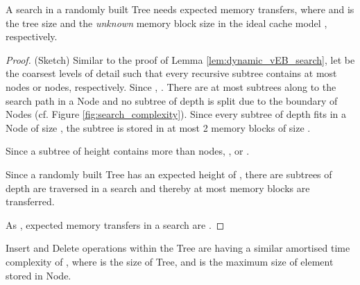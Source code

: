 \begin{lemma}
A search in a randomly built Tree needs  expected memory
transfers, where  and  is the tree size and the {\em unknown} memory
block size in the ideal cache model \cite{Frigo:1999:CA:795665.796479}, 
respectively. 
\label{lem:DeltaTree_search}
\end{lemma}
\begin{proof}(Sketch)
Similar to the proof of Lemma \ref{lem:dynamic_vEB_search}, let  be the
coarsest levels of detail such that every recursive subtree contains at most
 nodes or  nodes, respectively. Since , . There are
at most  subtrees along to the search path in a Node and no
subtree of depth  is split due to the boundary of Nodes (cf. Figure
\ref{fig:search_complexity}). Since every subtree of depth  fits in a
Node of size , the subtree is stored in at most 2 memory blocks of
size .

Since a subtree of height  contains more than  nodes, 
, or . 

Since a randomly built Tree has an expected height of , there
are  subtrees of depth  are traversed in a search and
thereby at most   memory
blocks are transferred.

As , expected memory transfers in a search are .
\end{proof}

\begin{lemma}
Insert and Delete operations within the Tree are having a similar 
amortised time complexity of , where  is the size of Tree,
and  is the maximum size of element stored in Node.
\label{lem:amortised_cost}
\end{lemma}

